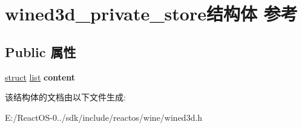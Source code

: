 \hypertarget{structwined3d__private__store}{}\section{wined3d\+\_\+private\+\_\+store结构体 参考}
\label{structwined3d__private__store}
\subsection*{Public 属性}
\begin{DoxyCompactItemize}
\item 
\mbox{\label{structwined3d__private__store_a4c5792fd60db86a070e50f91c518393d}} 
\hyperlink{interfacestruct}{struct} \hyperlink{classlist}{list} {\bfseries content}
\end{DoxyCompactItemize}


该结构体的文档由以下文件生成\+:\begin{DoxyCompactItemize}
\item 
E\+:/\+React\+O\+S-\/0../sdk/include/reactos/wine/wined3d.\+h\end{DoxyCompactItemize}
